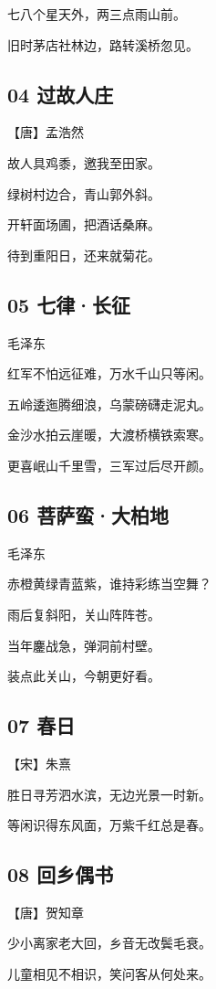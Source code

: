 \documentclass[12pt]{article}
\begin{document}
七八个星天外，两三点雨山前。

旧时茅店社林边，路转溪桥忽见。

\subsection*{04 过故人庄}

【唐】孟浩然
   
故人具鸡黍，邀我至田家。

绿树村边合，青山郭外斜。

开轩面场圃，把酒话桑麻。

待到重阳日，还来就菊花。

\subsection*{05 七律·长征}

毛泽东

红军不怕远征难，万水千山只等闲。

五岭逶迤腾细浪，乌蒙磅礴走泥丸。

金沙水拍云崖暖，大渡桥横铁索寒。

更喜岷山千里雪，三军过后尽开颜。

\subsection*{06 菩萨蛮·大柏地}

毛泽东

赤橙黄绿青蓝紫，谁持彩练当空舞？

雨后复斜阳，关山阵阵苍。

当年鏖战急，弹洞前村壁。

装点此关山，今朝更好看。

\subsection*{07 春日}

【宋】朱熹

胜日寻芳泗水滨，无边光景一时新。

等闲识得东风面，万紫千红总是春。

\subsection*{08 回乡偶书}

【唐】贺知章

少小离家老大回，乡音无改鬓毛衰。

儿童相见不相识，笑问客从何处来。
\end{document}
